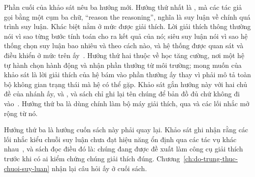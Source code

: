 Phần cuối của khảo sát nêu ba hướng mới. Hướng thứ nhất là
, mà các tác giả gọi bằng một cụm ba chữ,
\enquote{reason the reasoning}, nghĩa là suy luận về chính quá trình suy luận.
Khác biệt nằm ở mức được giải thích. Lời giải thích thông thường nói vì sao
từng bước tính toán cho ra kết quả của nó; siêu suy luận nói vì sao hệ thống
chọn suy luận bao nhiêu và theo cách nào, và hệ thống được quan sát và điều
khiển ở mức trên ấy~\autocite{p20trends}. Hướng thứ hai thuộc về học tăng
cường, nơi một hệ tự hành chọn hành động và nhận phần thưởng từ môi trường;
mong muốn của khảo sát là lời giải thích của hệ bám vào phần thưởng ấy thay vì
phải mô tả toàn bộ không gian trạng thái mà hệ có thể gặp. Khảo sát gắn hướng
này với hai chủ đề của nhánh ấy,
 và
, và sách chỉ ghi lại tên chúng
để bản đồ đủ chứ không đi vào~\autocite{p20trends}. Hướng thứ ba là dùng chính
 làm bộ máy giải thích, qua
 và các lối nhắc mở rộng từ nó.

Hướng thứ ba là hướng cuốn sách này phải quay lại. Khảo sát ghi nhận rằng các
lối nhắc kiểu chuỗi suy luận chưa đạt hiệu năng ổn định qua các tác vụ khác
nhau~\autocite{p20trends}, và sách đọc điều đó là: chúng đang được đề xuất làm
công cụ giải thích trước khi có ai kiểm chứng chúng giải thích đúng.
Chương~\ref{ch:do-trung-thuc-chuoi-suy-luan} nhận lại câu hỏi ấy ở cuối sách.
